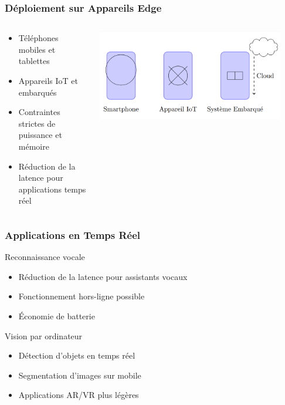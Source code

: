 \documentclass[10pt]{beamer}
\begin{document}
\begin{frame}
\frametitle{Déploiement sur Appareils Edge}
\begin{columns}
\begin{column}{0.6\textwidth}
\begin{itemize}
    \item Téléphones mobiles et tablettes
    \item Appareils IoT et embarqués
    \item Contraintes strictes de puissance et mémoire
    \item Réduction de la latence pour applications temps réel
\end{itemize}
\end{column}
\begin{column}{0.4\textwidth}
\centering
\includegraphics[width=0.9\textwidth]{edge_devices.jpg}
\end{column}
\end{columns}
\end{frame}

\begin{frame}
\frametitle{Applications en Temps Réel}
\begin{exampleblock}{Reconnaissance vocale}
\begin{itemize}
    \item Réduction de la latence pour assistants vocaux
    \item Fonctionnement hors-ligne possible
    \item Économie de batterie
\end{itemize}
\end{exampleblock}

\begin{exampleblock}{Vision par ordinateur}
\begin{itemize}
    \item Détection d'objets en temps réel
    \item Segmentation d'images sur mobile
    \item Applications AR/VR plus légères
\end{itemize}
\end{exampleblock}
\end{frame}
\end{document}

